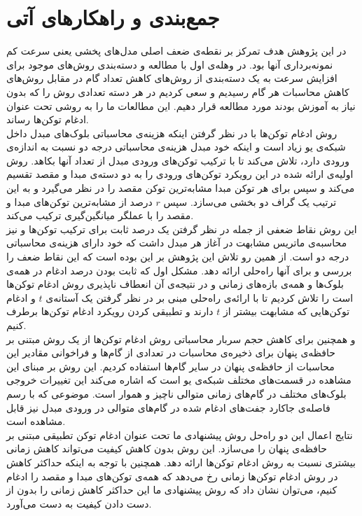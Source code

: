 \chapter{جمع‌بندی و راهکار‌های آتی}

در این پژوهش هدف تمرکز بر نقطه‌ی ضعف اصلی مدل‌های پخشی یعنی سرعت کم نمونه‌برداری آنها بود. در وهله‌ی اول با مطالعه و دسته‌بندی روش‌های موجود برای افزایش سرعت به یک دسته‌بندی از روش‌های کاهش تعداد گام در مقابل روش‌های کاهش محاسبات هر گام رسیدیم و سعی کردیم در هر دسته تعدادی روش را که بدون نیاز به آموزش بودند مورد مطالعه قرار دهیم. این مطالعات ما را به روشی تحت عنوان ادغام توکن‌ها رساند.
\\
روش ادغام توکن‌ها با در نظر گرفتن اینکه هزینه‌ی محاسباتی بلوک‌های مبدل داخل شبکه‌ی یو زیاد است و اینکه خود مبدل هزینه‌ی محاسباتی درجه دو نسبت به اندازه‌ی ورودی دارد، تلاش می‌کند تا با ترکیب توکن‌های ورودی مبدل از تعداد آنها بکاهد. روش اولیه‌ی ارائه شده در این رویکرد توکن‌های ورودی را به دو دسته‌ی مبدا و مقصد تقسیم می‌کند و سپس برای هر توکن مبدا مشابه‌ترین توکن مقصد را در نظر می‌گیرد و به این ترتیب یک گراف دو بخشی می‌سازد. سپس $r$ درصد از مشابه‌ترین توکن‌های مبدا و مقصد را با عملگر میانگین‌گیری ترکیب می‌کند.
\\
این روش نقاط ضعفی از جمله در نظر گرفتن یک درصد ثابت برای ترکیب توکن‌ها و نیز محاسبه‌ی ماتریس مشابهت در آغاز هر مبدل داشت که خود دارای هزینه‌ی محاسباتی درجه دو است. از همین رو تلاش این پژوهش بر این بوده است که این نقاط ضعف را بررسی و برای آنها راه‌حلی ارائه دهد. مشکل اول که ثابت بودن درصد ادغام در همه‌ی بلوک‌ها و همه‌ی بازه‌های زمانی و در نتیجه‌ی آن انعطاف ناپذیری روش ادغام توکن‌ها است را تلاش کردیم تا با ارائه‌ی راه‌حلی مبنی بر در نظر گرفتن یک آستانه‌ی $t$ و ادغام توکن‌هایی که مشابهت بیشتر از $t$ دارند و تطبیقی کردن رویکرد ادغام توکن‌ها برطرف کنیم.
\\
و همچنین برای کاهش حجم سربار محاسباتی روش ادغام توکن‌ها از یک روش مبتنی بر حافظه‌ی پنهان برای ذخیره‌ی محاسبات در تعدادی از گام‌ها و فراخوانی مقادیر این محاسبات از حافظه‌ی پنهان در سایر گام‌ها استفاده کردیم. این روش بر مبنای این مشاهده در قسمت‌های مختلف شبکه‌ی یو است که اشاره می‌کند این تغییرات خروجی بلوک‌های مختلف در گام‌های زمانی متوالی ناچیز و هموار است. موضوعی که با رسم فاصله‌ی جاکارد جفت‌های ادغام شده در گام‌های متوالی در ورودی مبدل نیز قابل مشاهده است.
\\
نتایج اعمال این دو راه‌حل روش پیشنهادی ما تحت عنوان ادغام توکن تطبیقی مبتنی بر حافظه‌ی پنهان را می‌سازد. این روش بدون کاهش کیفیت می‌تواند کاهش زمانی بیشتری نسبت به روش ادغام توکن‌ها ارائه دهد. همچنین با توجه به اینکه حداکثر کاهش در روش ادغام توکن‌ها زمانی رخ می‌دهد که همه‌ی توکن‌های مبدا و مقصد را ادغام کنیم، می‌توان نشان داد که روش پیشنهادی ما این حداکثر کاهش زمانی را بدون از دست دادن کیفیت به دست می‌آورد.
\\



